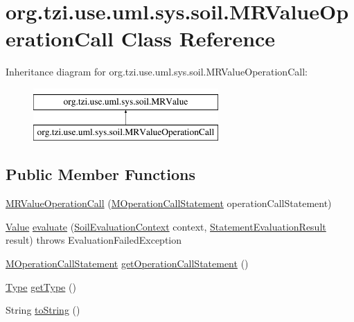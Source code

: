 \hypertarget{classorg_1_1tzi_1_1use_1_1uml_1_1sys_1_1soil_1_1_m_r_value_operation_call}{\section{org.\-tzi.\-use.\-uml.\-sys.\-soil.\-M\-R\-Value\-Operation\-Call Class Reference}
\label{classorg_1_1tzi_1_1use_1_1uml_1_1sys_1_1soil_1_1_m_r_value_operation_call}
}
Inheritance diagram for org.\-tzi.\-use.\-uml.\-sys.\-soil.\-M\-R\-Value\-Operation\-Call\-:\begin{figure}[H]
\begin{center}
\leavevmode
\includegraphics[height=2.000000cm]{classorg_1_1tzi_1_1use_1_1uml_1_1sys_1_1soil_1_1_m_r_value_operation_call}
\end{center}
\end{figure}
\subsection*{Public Member Functions}
\begin{DoxyCompactItemize}
\item 
\hyperlink{classorg_1_1tzi_1_1use_1_1uml_1_1sys_1_1soil_1_1_m_r_value_operation_call_a993c151518b06dd13bad6b7cc2aef714}{M\-R\-Value\-Operation\-Call} (\hyperlink{classorg_1_1tzi_1_1use_1_1uml_1_1sys_1_1soil_1_1_m_operation_call_statement}{M\-Operation\-Call\-Statement} operation\-Call\-Statement)
\item 
\hyperlink{classorg_1_1tzi_1_1use_1_1uml_1_1ocl_1_1value_1_1_value}{Value} \hyperlink{classorg_1_1tzi_1_1use_1_1uml_1_1sys_1_1soil_1_1_m_r_value_operation_call_a3d5e9e10fd9f6ca7e70ac60e438a5a95}{evaluate} (\hyperlink{classorg_1_1tzi_1_1use_1_1uml_1_1sys_1_1soil_1_1_soil_evaluation_context}{Soil\-Evaluation\-Context} context, \hyperlink{classorg_1_1tzi_1_1use_1_1uml_1_1sys_1_1_statement_evaluation_result}{Statement\-Evaluation\-Result} result)  throws Evaluation\-Failed\-Exception 
\item 
\hyperlink{classorg_1_1tzi_1_1use_1_1uml_1_1sys_1_1soil_1_1_m_operation_call_statement}{M\-Operation\-Call\-Statement} \hyperlink{classorg_1_1tzi_1_1use_1_1uml_1_1sys_1_1soil_1_1_m_r_value_operation_call_a9e599dc3837897e998e1803f15c707b9}{get\-Operation\-Call\-Statement} ()
\item 
\hyperlink{interfaceorg_1_1tzi_1_1use_1_1uml_1_1ocl_1_1type_1_1_type}{Type} \hyperlink{classorg_1_1tzi_1_1use_1_1uml_1_1sys_1_1soil_1_1_m_r_value_operation_call_a5b18da25fd58e745d4cc637a36ebf283}{get\-Type} ()
\item 
String \hyperlink{classorg_1_1tzi_1_1use_1_1uml_1_1sys_1_1soil_1_1_m_r_value_operation_call_ab51e7cf39c0b6652d8e7426cf31f5db4}{to\-String} ()
\end{DoxyCompactItemize}


